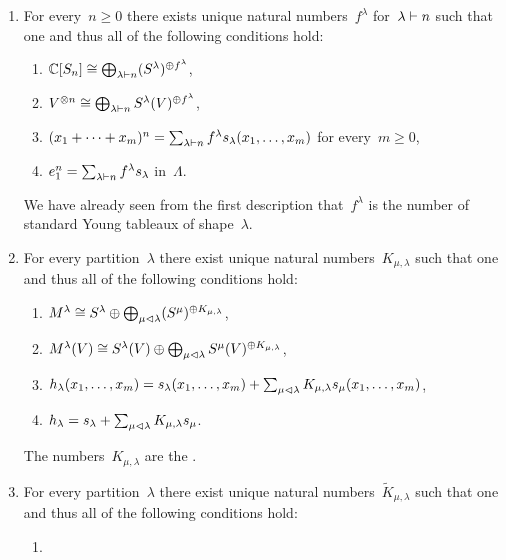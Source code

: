 \documentclass[a4paper,10pt]{scrartcl}
\begin{document}
\begin{example}
  \leavevmode
  \begin{enumerate}
    \item
      For every~$n \geq 0$ there exists unique natural numbers~$f^\lambda$ for~$\lambda \vdash n$ such that one and thus all of the following conditions hold:
      \begin{enumerate}
        \item
          $\mathbb{C}[S_n] \cong \bigoplus_{\lambda \vdash n} (S^\lambda)^{\oplus f^\lambda}$,
        \item
          $V^{\otimes n} \cong \bigoplus_{\lambda \vdash n} S^\lambda(V)^{\oplus f^\lambda}$,
        \item
          $(x_1 + \dotsb + x_m)^n = \sum_{\lambda \vdash n} f^\lambda s_\lambda(x_1, \dotsc, x_m)$ for every~$m \geq 0$,
        \item
          $e_1^n = \sum_{\lambda \vdash n} f^\lambda s_\lambda$ in~$\Lambda$.
      \end{enumerate}
      We have already seen from the first description that~$f^\lambda$ is the number of standard Young tableaux of shape~$\lambda$.
    \item
      For every partition~$\lambda$ there exist unique natural numbers~$K_{\mu, \lambda}$ such that one and thus all of the following conditions hold:
      \begin{enumerate}
        \item
          $M^\lambda \cong S^\lambda \oplus \bigoplus_{\mu \vartriangleleft \lambda} (S^\mu)^{\oplus K_{\mu, \lambda}}$,
        \item
          $M^\lambda(V) \cong S^\lambda(V) \oplus \bigoplus_{\mu \vartriangleleft \lambda} S^\mu(V)^{\oplus K_{\mu, \lambda}}$,
        \item
          $h_\lambda(x_1, \dotsc, x_m) = s_\lambda(x_1, \dotsc, x_m) + \sum_{\mu \vartriangleleft \lambda} K_{\mu, \lambda} s_\mu(x_1, \dotsc, x_m)$,
        \item
          $h_\lambda = s_\lambda + \sum_{\mu \vartriangleleft \lambda} K_{\mu, \lambda} s_\mu$.
      \end{enumerate}
      The numbers~$K_{\mu, \lambda}$ are the .
    \item
      For every partition~$\lambda$ there exist unique natural numbers~$\tilde{K}_{\mu, \lambda}$ such that one and thus all of the following conditions hold:
      \begin{enumerate}
        \item

\end{enumerate}
\end{enumerate}
\end{example}
\end{document}

